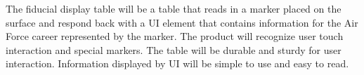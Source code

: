 The fiducial display table will be a table that reads in a marker placed on the surface and respond back with a UI element that contains information for the Air Force career represented by the marker. The product will recognize user touch interaction and special markers. The table will be durable and sturdy for user interaction. Information displayed by UI will be simple to use and easy to read. 
